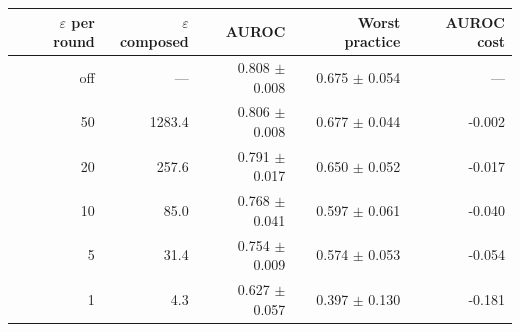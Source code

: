 \begin{tabular}{rrrrr}
    \toprule
    $\varepsilon$ per round & $\varepsilon$ composed & AUROC & Worst practice & AUROC cost \\
    \midrule
    off & --- & 0.808 $\pm$ 0.008 & 0.675 $\pm$ 0.054 & --- \\
    50 & 1283.4 & 0.806 $\pm$ 0.008 & 0.677 $\pm$ 0.044 & -0.002 \\
    20 & 257.6 & 0.791 $\pm$ 0.017 & 0.650 $\pm$ 0.052 & -0.017 \\
    10 & 85.0 & 0.768 $\pm$ 0.041 & 0.597 $\pm$ 0.061 & -0.040 \\
    5 & 31.4 & 0.754 $\pm$ 0.009 & 0.574 $\pm$ 0.053 & -0.054 \\
    1 & 4.3 & 0.627 $\pm$ 0.057 & 0.397 $\pm$ 0.130 & -0.181 \\
    \bottomrule
\end{tabular}
